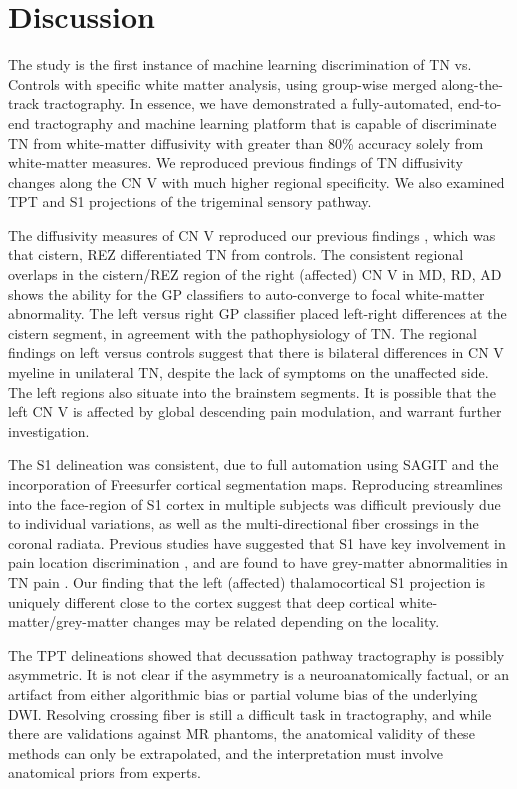 \section{Discussion}
The study is the first instance of machine learning discrimination of TN vs. Controls with specific white matter analysis, using group-wise merged along-the-track tractography. In essence, we have demonstrated a fully-automated, end-to-end tractography and machine learning platform that is capable of discriminate TN from white-matter diffusivity with greater than 80\% accuracy solely from white-matter measures. We reproduced previous findings of TN diffusivity changes along the CN V with much higher regional specificity. We also examined TPT and S1 projections of the trigeminal sensory pathway.

The diffusivity measures of CN V reproduced our previous findings \cite{Chen2016a}, which was that cistern, REZ differentiated TN from controls. The consistent regional overlaps in the cistern/REZ region of the right (affected) CN V in MD, RD, AD shows the ability for the GP classifiers to auto-converge to focal white-matter abnormality. The left versus right GP classifier placed left-right differences at the cistern segment, in agreement with the pathophysiology of TN. The regional findings on left versus controls suggest that there is bilateral differences in CN V myeline in unilateral TN, despite the lack of symptoms on the unaffected side. The left regions also situate into the brainstem segments. It is possible that the left CN V is affected by global descending pain modulation, and warrant further investigation. 

The S1 delineation was consistent, due to full automation using SAGIT and the incorporation of Freesurfer cortical segmentation maps. Reproducing streamlines into the face-region of S1 cortex in multiple subjects was difficult previously due to individual variations, as well as the multi-directional fiber crossings in the coronal radiata. Previous studies have suggested that S1 have key involvement in pain location discrimination \cite{bushnell1999pain}, and are found to have grey-matter abnormalities in TN pain \cite{Desouza2013c}. Our finding that the left (affected) thalamocortical S1 projection is uniquely different close to the cortex suggest that deep cortical white-matter/grey-matter changes may be related depending on the locality. 

The TPT delineations showed that decussation pathway tractography is possibly asymmetric. It is not clear if the asymmetry is a neuroanatomically factual, or an artifact from either algorithmic bias or partial volume bias of the underlying DWI. Resolving crossing fiber is still a difficult task in tractography, and while there are validations against MR phantoms, the anatomical validity of these methods can only be extrapolated, and the interpretation must involve anatomical priors from experts.  

